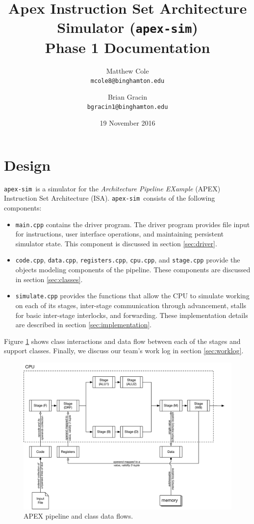 \documentclass[12pt]{article}
\title{Apex Instruction Set Architecture Simulator (\texttt{apex-sim}) \\ Phase 1 Documentation}
\author{Matthew Cole \\ \texttt{mcole8@binghamton.edu}
\and
Brian Gracin \\
	\texttt{bgracin1@binghamton.edu}}
\date{19 November 2016}
\newcommand{\codename}[0]{\texttt{apex-sim}~}
\begin{document}
\maketitle
\tableofcontents
\newpage
\listoffigures
\listoftables
\newpage
{}


\section{Design}
\codename is a simulator for the \textit{Architecture Pipeline EXample} (APEX) Instruction Set Architecture (ISA).
\codename consists of the following components:
\begin{itemize}
  \item \texttt{main.cpp} contains the driver program. The driver program provides file input for instructions, user interface operations, and maintaining persistent simulator state. This component is discussed in section \ref{sec:driver}.
  \item \texttt{code.cpp}, \texttt{data.cpp}, \texttt{registers.cpp}, \texttt{cpu.cpp}, and \texttt{stage.cpp} provide the objects modeling components of the pipeline. These components are discussed in section \ref{sec:classes}.
  \item \texttt{simulate.cpp} provides the functions that allow the CPU to simulate working on each of its stages, inter-stage communication through advancement, stalls for basic inter-stage interlocks, and forwarding. These implementation details are described in section \ref{sec:implementation}.
\end{itemize}
Figure \ref{fig:overview} shows class interactions and data flow between each of the stages and support classes.
Finally, we discuss our team's work log in section \ref{sec:worklog}.

\begin{figure}
  \includegraphics[width=\linewidth]{./figs/apex-sim-overview.pdf}
  \caption{APEX pipeline and class data flows.}
  \label{fig:overview}
\end{figure}
\end{document}
